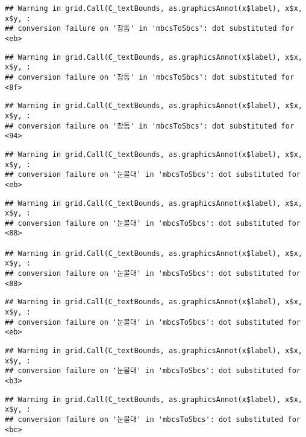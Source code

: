 \documentclass[
]{article}
\begin{document}
\begin{verbatim}
## Warning in grid.Call(C_textBounds, as.graphicsAnnot(x$label), x$x, x$y, :
## conversion failure on '참돔' in 'mbcsToSbcs': dot substituted for <eb>
\end{verbatim}

\begin{verbatim}
## Warning in grid.Call(C_textBounds, as.graphicsAnnot(x$label), x$x, x$y, :
## conversion failure on '참돔' in 'mbcsToSbcs': dot substituted for <8f>
\end{verbatim}

\begin{verbatim}
## Warning in grid.Call(C_textBounds, as.graphicsAnnot(x$label), x$x, x$y, :
## conversion failure on '참돔' in 'mbcsToSbcs': dot substituted for <94>
\end{verbatim}

\begin{verbatim}
## Warning in grid.Call(C_textBounds, as.graphicsAnnot(x$label), x$x, x$y, :
## conversion failure on '눈볼대' in 'mbcsToSbcs': dot substituted for <eb>
\end{verbatim}

\begin{verbatim}
## Warning in grid.Call(C_textBounds, as.graphicsAnnot(x$label), x$x, x$y, :
## conversion failure on '눈볼대' in 'mbcsToSbcs': dot substituted for <88>

## Warning in grid.Call(C_textBounds, as.graphicsAnnot(x$label), x$x, x$y, :
## conversion failure on '눈볼대' in 'mbcsToSbcs': dot substituted for <88>
\end{verbatim}

\begin{verbatim}
## Warning in grid.Call(C_textBounds, as.graphicsAnnot(x$label), x$x, x$y, :
## conversion failure on '눈볼대' in 'mbcsToSbcs': dot substituted for <eb>
\end{verbatim}

\begin{verbatim}
## Warning in grid.Call(C_textBounds, as.graphicsAnnot(x$label), x$x, x$y, :
## conversion failure on '눈볼대' in 'mbcsToSbcs': dot substituted for <b3>
\end{verbatim}

\begin{verbatim}
## Warning in grid.Call(C_textBounds, as.graphicsAnnot(x$label), x$x, x$y, :
## conversion failure on '눈볼대' in 'mbcsToSbcs': dot substituted for <bc>
\end{verbatim}
\end{document}
